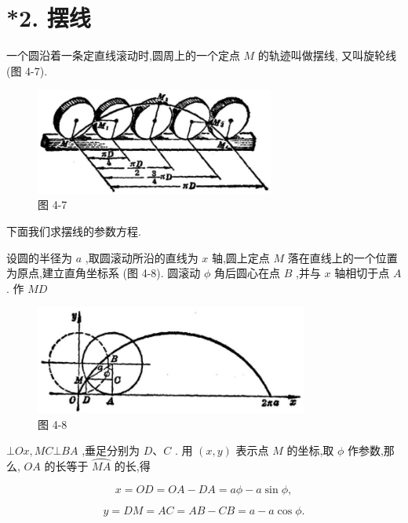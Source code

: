 \documentclass[lang=cn,newtx,10pt,scheme=chinese]{elegantbook}
\begin{document}
\section*{*2. 摆线}

一个圆沿着一条定直线滚动时,圆周上的一个定点 \(M\) 的轨迹叫做摆线, 又叫旋轮线 (图 4-7).

\begin{figure}[h]
  \centering
  \includegraphics[max width=0.7\textwidth]{images/01912cc2-ffb6-728e-9ae7-b113ff05c64b_169_676481.jpg}
  \caption{图 4-7}
\end{figure}



下面我们求摆线的参数方程.

设圆的半径为 \(a\) ,取圆滚动所沿的直线为 \(x\) 轴,圆上定点 \(M\) 落在直线上的一个位置为原点,建立直角坐标系 (图 4-8). 圆滚动 \(\phi\) 角后圆心在点 \(B\) ,并与 \(x\) 轴相切于点 \(A\) . 作 \({MD}\)

\begin{figure}[h]
  \centering
  \includegraphics[max width=0.8\textwidth]{images/01912cc2-ffb6-728e-9ae7-b113ff05c64b_169_875701.jpg}
  \caption{图 4-8}
\end{figure}



\(\bot {Ox},{MC} \bot {BA}\) ,垂足分别为 \(D\text{、}C\) . 用 \(\left( {x,y}\right)\) 表示点 \(M\) 的坐标,取 \(\phi\) 作参数,那么, \({OA}\) 的长等于 \(\overset{⏜}{MA}\) 的长,得

\[
  x = {OD} = {OA} - {DA} = {a\phi } - a\sin \phi ,
\]

\[
  y = {DM} = {AC} = {AB} - {CB} = a - a\cos \phi .
\]
\end{document}
